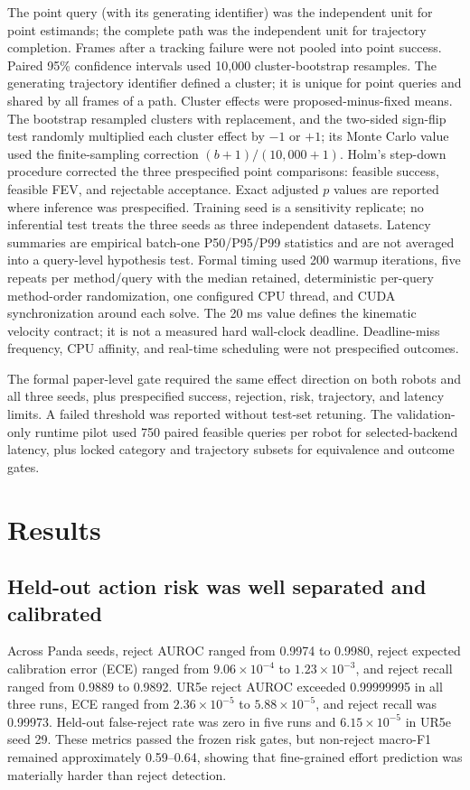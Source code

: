 \documentclass[10pt,a4paper]{article}
\begin{document}
The point query (with its generating identifier) was the independent unit for point
estimands; the complete path was the independent unit for trajectory completion. Frames
after a tracking failure were not pooled into point success. Paired 95\% confidence
intervals used 10,000 cluster-bootstrap resamples. The generating trajectory identifier
defined a cluster; it is unique for point queries and shared by all frames of a path.
Cluster effects were proposed-minus-fixed means. The bootstrap resampled clusters with
replacement, and the two-sided sign-flip test randomly multiplied each cluster effect
by $-1$ or $+1$; its Monte Carlo value used the finite-sampling correction
$(b+1)/(10{,}000+1)$. Holm's step-down procedure corrected the three prespecified point
comparisons: feasible success, feasible FEV, and rejectable acceptance. Exact adjusted
$p$ values are reported where inference was prespecified. Training seed is a sensitivity
replicate; no inferential test treats the three seeds as three independent datasets.
Latency summaries are empirical batch-one P50/P95/P99 statistics and are not averaged
into a query-level hypothesis test. Formal timing used 200 warmup iterations, five
repeats per method/query with the median retained, deterministic per-query method-order
randomization, one configured CPU thread, and CUDA synchronization around each solve.
The 20 ms value defines the kinematic velocity contract; it is not a measured hard
wall-clock deadline. Deadline-miss frequency, CPU affinity, and real-time scheduling
were not prespecified outcomes.

The formal paper-level gate required the same effect direction on both robots and all
three seeds, plus prespecified success, rejection, risk, trajectory, and latency limits.
A failed threshold was reported without test-set retuning. The validation-only runtime
pilot used 750 paired feasible queries per robot for selected-backend latency, plus
locked category and trajectory subsets for equivalence and outcome gates.

\section{Results}

\subsection{Held-out action risk was well separated and calibrated}

Across Panda seeds, reject AUROC ranged from 0.9974 to 0.9980, reject expected
calibration error (ECE) ranged from $9.06\times10^{-4}$ to
$1.23\times10^{-3}$, and reject recall ranged from 0.9889 to 0.9892. UR5e reject
AUROC exceeded 0.99999995 in all three runs, ECE ranged from
$2.36\times10^{-5}$ to $5.88\times10^{-5}$, and reject recall was 0.99973.
Held-out false-reject rate was zero in five runs and $6.15\times10^{-5}$ in UR5e seed
29. These metrics passed the frozen risk gates, but non-reject macro-F1 remained
approximately 0.59--0.64, showing that fine-grained effort prediction was materially
harder than reject detection.
\end{document}
